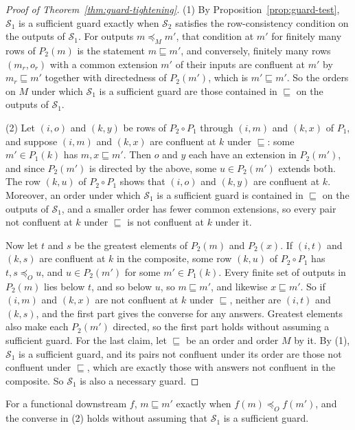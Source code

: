 \documentclass[sigconf]{cidr-2027}
\theoremstyle{remark}
\newcommand{\OutputOrd}{\preceq_O}
\newcommand{\outrel}{extends\xspace}          %
\newcommand{\Spec}{\mathcal{S}}
\begin{document}
\begin{proof}[Proof of Theorem~\ref{thm:guard-tightening}]
(1) By Proposition~\ref{prop:guard-test}, $\Spec_1$ is a sufficient guard exactly when
$\Spec_2$ satisfies the row-consistency condition on the outputs of
$\Spec_1$. For outputs $m\preceq_M m'$, that condition at $m'$ for finitely
many rows of $P_2(m)$ is the statement $m\sqsubseteq m'$, and conversely,
finitely many rows $(m_r,o_r)$ with a common extension $m'$ of their inputs
are confluent at $m'$ by $m_r\sqsubseteq m'$ together with directedness of
$P_2(m')$, which is $m'\sqsubseteq m'$. So the orders on $M$ under which
$\Spec_1$ is a sufficient guard are those contained in $\sqsubseteq$ on the
outputs of $\Spec_1$.

(2) Let $(i,o)$ and $(k,y)$ be rows of $P_2\circ P_1$ through $(i,m)$ and
$(k,x)$ of $P_1$, and suppose $(i,m)$ and $(k,x)$ are confluent at $k$ under
$\sqsubseteq$: some $m'\in P_1(k)$ has $m,x\sqsubseteq m'$. Then $o$ and $y$
each have an extension in $P_2(m')$, and since $P_2(m')$ is directed by the above,
some $u\in P_2(m')$ \outrel both. The row $(k,u)$ of $P_2\circ P_1$ shows
that $(i,o)$ and $(k,y)$ are confluent at $k$. Moreover, an
order under which $\Spec_1$ is a sufficient guard is contained in $\sqsubseteq$ on the
outputs of $\Spec_1$, and a smaller order has fewer common extensions,
so every pair not confluent at $k$ under $\sqsubseteq$ is not confluent at $k$ under it.

Now let $t$ and $s$ be the greatest elements of $P_2(m)$ and $P_2(x)$. If
$(i,t)$ and $(k,s)$ are confluent at $k$ in the composite, some row $(k,u)$
of $P_2\circ P_1$ has $t,s\OutputOrd u$, and $u\in P_2(m')$ for some
$m'\in P_1(k)$. Every finite set of outputs in $P_2(m)$ lies below $t$, and
so below $u$, so $m\sqsubseteq m'$, and likewise $x\sqsubseteq m'$. So
if $(i,m)$ and $(k,x)$ are not confluent at $k$ under $\sqsubseteq$, neither are
$(i,t)$ and $(k,s)$, and the first part gives the converse for any answers. Greatest elements also make each $P_2(m')$ directed, so the first part holds
without assuming a sufficient guard. For the last claim, let $\sqsubseteq$ be an order and order $M$ by it. By
(1), $\Spec_1$ is a sufficient guard, and its pairs not confluent under its
order are those not confluent under $\sqsubseteq$, which are exactly those
with answers not confluent in the composite. So $\Spec_1$ is also a
necessary guard.
\end{proof}

For a functional downstream $f$, $m\sqsubseteq m'$ exactly when $f(m)\OutputOrd
f(m')$, and the converse in (2) holds without assuming that $\Spec_1$ is a
sufficient guard.
\end{document}
